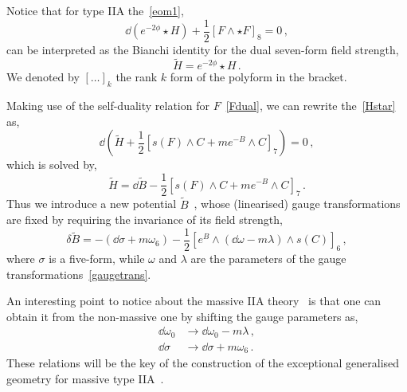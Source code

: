 \documentclass[debug]{phd}
\begin{document}
				Notice that for type IIA the~\eqref{eom1},
						\begin{equation}\label{Hstar}
							\dd (e^{-2\phi} \star H) + \frac{1}{2} \left[ F \wedge \star F \right]_8 = 0 \, ,
						\end{equation}
				can be interpreted as the Bianchi identity for the dual seven-form field strength,
						\begin{equation}
							\tilde{H} = e^{-2\phi} \star H \, .
						\end{equation}
				We denoted by $[\ldots]_k$ the rank $k$ form of the polyform in the bracket.

				Making use of the self-duality relation for $F$~\eqref{Fdual}, we can rewrite the~\eqref{Hstar} as,
						\begin{equation}
							\dd \left( \tilde H + \frac{1}{2} \left[ s(F) \wedge C + m e^{-B} \wedge C \right]_7 \right) = 0\, ,
						\end{equation}
				which is solved by,
						\begin{equation}
							\tilde H = \dd \tilde{B} - \frac{1}{2} \left[ s(F) \wedge C + m e^{-B} \wedge C \right]_7 \, .
						\end{equation}
				Thus we introduce a new potential $\tilde{B}$~\cite{Bergshoeff:1997ak, Bergshoeff:2006qw}, whose (linearised) gauge transformations are fixed by requiring the invariance of its field strength,
						\begin{equation}
							\delta \tilde{B} = -(\dd \sigma + m \omega_6) - \frac{1}{2} \left[ e^{B} \wedge (\dd \omega - m \lambda ) \wedge s(C) \right]_6 \, ,
						\end{equation}
				where $\sigma$ is a five-form, while $\omega$ and $\lambda$ are the parameters of the gauge transformations~\eqref{gaugetrans}.
				
				An interesting point to notice about the massive IIA theory~\cite{RomansMass} is that one can obtain it from the non-massive one by shifting the gauge parameters as,
						\begin{equation}\label{gaugeshifts}
							\begin{split}
								\dd \omega_0 &\longrightarrow \dd \omega_0 - m \lambda \, , \\
								\dd \sigma & \longrightarrow \dd \sigma + m \omega_6 \, .
							\end{split}
						\end{equation}
				These relations will be the key of the construction of the exceptional generalised geometry for massive type IIA~\cite{oscar1}.
				
\end{document}
